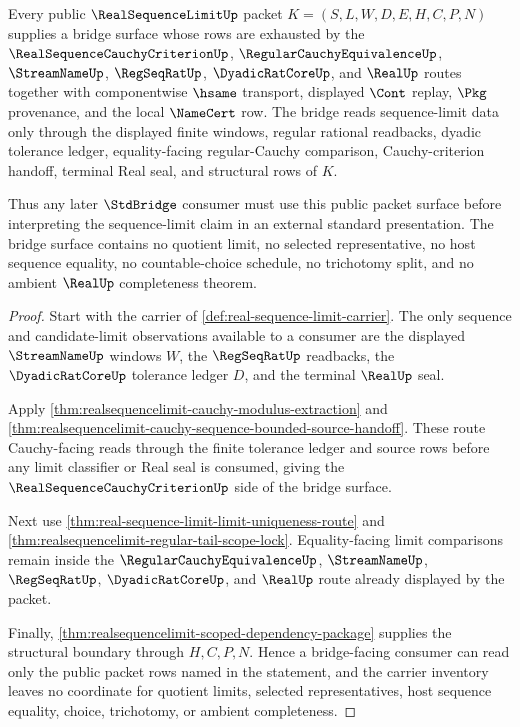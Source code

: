 \begin{theorem}\label{thm:realsequencelimit-bridge-surface}
Every public $\RealSequenceLimitUp$ packet $K=(S,L,W,D,E,H,C,P,N)$ supplies a bridge surface whose rows are exhausted by the $\RealSequenceCauchyCriterionUp$, $\RegularCauchyEquivalenceUp$, $\StreamNameUp$, $\RegSeqRatUp$, $\DyadicRatCoreUp$, and $\RealUp$ routes together with componentwise $\hsame$ transport, displayed $\Cont$ replay, $\Pkg$ provenance, and the local $\NameCert$ row. The bridge reads sequence-limit data only through the displayed finite windows, regular rational readbacks, dyadic tolerance ledger, equality-facing regular-Cauchy comparison, Cauchy-criterion handoff, terminal Real seal, and structural rows of $K$.

Thus any later $\StdBridge$ consumer must use this public packet surface before interpreting the sequence-limit claim in an external standard presentation. The bridge surface contains no quotient limit, no selected representative, no host sequence equality, no countable-choice schedule, no trichotomy split, and no ambient $\RealUp$ completeness theorem.
\end{theorem}
\begin{proof}
Start with the carrier of \autoref{def:real-sequence-limit-carrier}. The only sequence and candidate-limit observations available to a consumer are the displayed $\StreamNameUp$ windows $W$, the $\RegSeqRatUp$ readbacks, the $\DyadicRatCoreUp$ tolerance ledger $D$, and the terminal $\RealUp$ seal.

Apply \autoref{thm:realsequencelimit-cauchy-modulus-extraction} and \autoref{thm:realsequencelimit-cauchy-sequence-bounded-source-handoff}. These route Cauchy-facing reads through the finite tolerance ledger and source rows before any limit classifier or Real seal is consumed, giving the $\RealSequenceCauchyCriterionUp$ side of the bridge surface.

Next use \autoref{thm:real-sequence-limit-limit-uniqueness-route} and \autoref{thm:realsequencelimit-regular-tail-scope-lock}. Equality-facing limit comparisons remain inside the $\RegularCauchyEquivalenceUp$, $\StreamNameUp$, $\RegSeqRatUp$, $\DyadicRatCoreUp$, and $\RealUp$ route already displayed by the packet.

Finally, \autoref{thm:realsequencelimit-scoped-dependency-package} supplies the structural boundary through $H,C,P,N$. Hence a bridge-facing consumer can read only the public packet rows named in the statement, and the carrier inventory leaves no coordinate for quotient limits, selected representatives, host sequence equality, choice, trichotomy, or ambient completeness.
\end{proof}

